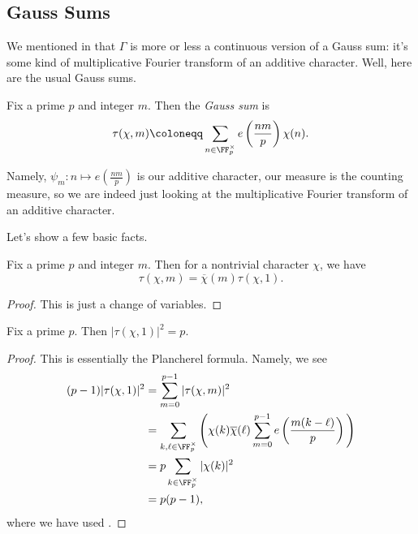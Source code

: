 \documentclass[../notes.tex]{subfiles}
\begin{document}
\subsection{Gauss Sums}
We mentioned in  that $\Gamma$ is more or less a continuous version of a Gauss sum: it's some kind of multiplicative Fourier transform of an additive character. Well, here are the usual Gauss sums.
\begin{definition}
	Fix a prime $p$ and integer $m$. Then the \textit{Gauss sum} is
	\[\tau(\chi,m)\coloneqq\sum_{n\in\FF_p^\times}e\left(\frac{nm}p\right)\chi(n).\]
\end{definition}
Namely, $\psi_m\colon n\mapsto e\left(\frac{nm}p\right)$ is our additive character, our measure is the counting measure, so we are indeed just looking at the multiplicative Fourier transform of an additive character.

Let's show a few basic facts.
\begin{lemma}
	Fix a prime $p$ and integer $m$. Then for a nontrivial character $\chi$, we have
	\[\tau(\chi,m)=\overline\chi(m)\tau(\chi,1).\]
\end{lemma}
\begin{proof}
	This is just a change of variables.
\end{proof}
\begin{lemma} \label{lem:mag-of-gauss-sum}
	Fix a prime $p$. Then $|\tau(\chi,1)|^2=p$.
\end{lemma}
\begin{proof}
	This is essentially the Plancherel formula. Namely, we see
	\begin{align*}
		(p-1)|\tau(\chi,1)|^2 &= \sum_{m=0}^{p-1}|\tau(\chi,m)|^2 \\
		&= \sum_{k,\ell\in\FF_p^\times}\Bigg(\chi(k)\overline\chi(\ell)\sum_{m=0}^{p-1}e\left(\frac{m(k-\ell)}p\right)\Bigg) \\
		&= p\sum_{k\in\FF_p^\times}|\chi(k)|^2 \\
		&= p(p-1),
	\end{align*}
	where we have used .
\end{proof}
\end{document}
